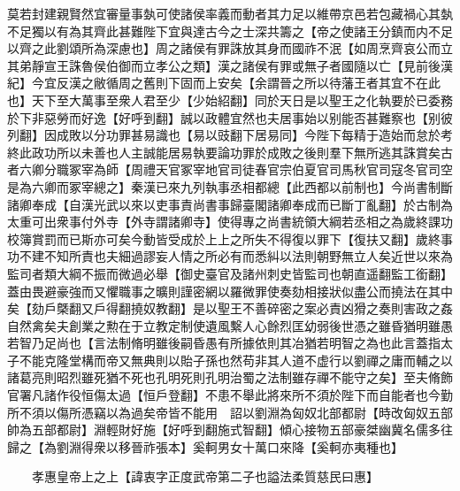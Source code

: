 莫若封建親賢然宜審量事埶可使諸侯率義而動者其力足以維帶京邑若包藏禍心其埶不足獨以有為其齊此甚難陛下宜與達古今之士深共籌之【帝之使諸王分鎮而内不足以齊之此劉頌所為深慮也】周之諸侯有罪誅放其身而國祚不泯【如周烹齊哀公而立其弟靜宣王誅魯侯伯御而立孝公之類】漢之諸侯有罪或無子者國隨以亡【見前後漢紀】今宜反漢之敝循周之舊則下固而上安矣【余謂晉之所以待藩王者其宜不在此也】天下至大萬事至衆人君至少【少始紹翻】同於天日是以聖王之化執要於已委務於下非惡勞而好逸【好呼到翻】誠以政體宜然也夫居事始以别能否甚難察也【别彼列翻】因成敗以分功罪甚易識也【易以豉翻下居易同】今陛下每精于造始而怠於考終此政功所以未善也人主誠能居易執要論功罪於成敗之後則羣下無所逃其誅賞矣古者六卿分職冢宰為師【周禮天官冢宰地官司徒春官宗伯夏官司馬秋官司寇冬官司空是為六卿而冢宰總之】秦漢已來九列執事丞相都總【此西都以前制也】今尚書制斷諸卿奉成【自漢光武以來以吏事責尚書事歸臺閣諸卿奉成而已斷丁亂翻】於古制為太重可出衆事付外寺【外寺謂諸卿寺】使得專之尚書統領大綱若丞相之為歲終課功校簿賞罰而已斯亦可矣今動皆受成於上上之所失不得復以罪下【復扶又翻】歲終事功不建不知所責也夫細過謬妄人情之所必有而悉糾以法則朝野無立人矣近世以來為監司者類大綱不振而微過必舉【御史臺官及諸州刺史皆監司也朝直遥翻監工銜翻】蓋由畏避豪強而又懼職事之曠則謹密網以羅微罪使奏劾相接狀似盡公而撓法在其中矣【劾戶槩翻又戶得翻撓奴教翻】是以聖王不善碎密之案必責凶猾之奏則害政之姦自然禽矣夫創業之勲在于立教定制使遺風繫人心餘烈匡幼弱後世憑之雖昏猶明雖愚若智乃足尚也【言法制脩明雖後嗣昏愚有所據依則其冶猶若明智之為也此言蓋指太子不能克隆堂構而帝又無典則以貽子孫也然苟非其人道不虚行以劉禪之庸而輔之以諸葛亮則昭烈雖死猶不死也孔明死則孔明治蜀之法制雖存禪不能守之矣】至夫脩飾官署凡諸作役恒傷太過【恒戶登翻】不患不舉此將來所不須於陛下而自能者也今勤所不須以傷所憑竊以為過矣帝皆不能用　詔以劉淵為匈奴北部都尉【時改匈奴五部帥為五部都尉】淵輕財好施【好呼到翻施式智翻】傾心接物五部豪桀幽冀名儒多往歸之【為劉淵得衆以移晉祚張本】奚軻男女十萬口來降【奚軻亦夷種也】

　　孝惠皇帝上之上【諱衷字正度武帝第二子也謚法柔質慈民曰惠】

